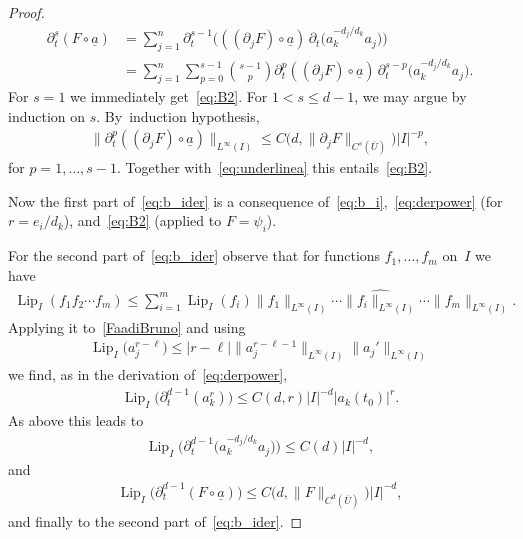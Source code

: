 \documentclass[pdftex]{sigma}
\numberwithin{equation}{section}
\def\ps{\psi}
\def\p{\partial}
\def\ul{\underline}
\def\Lip{\on{Lip}}
\renewcommand{\o}{\circ}
\let\on=\operatorname
\begin{document}
\begin{proof}
\begin{align*}
 \p_t^s (F \o \ul a)
 &= \sum_{j=1}^n \p_t^{s-1}\Big(((\p_{j} F)\o \ul a)\, \p_t \big( a_k^{- d_j/d_k} a_j\big)\Big)
 \\
 &= \sum_{j=1}^n \sum_{p=0}^{s-1}
 \binom{s-1}{p} \p_t^{p}((\p_{j} F)\o \ul a)\, \p_t^{s- p} \big( a_k^{- d_j/d_k} a_j\big).
 \end{align*}
 For $s=1$ we immediately get~\eqref{eq:B2}. For $1< s \le d-1$, we may argue by induction on $s$. By~induction hypothesis,
 \begin{gather*}
 \|\p_t^{p}((\p_{j} F)\o \ul a)\|_{L^\infty(I)} \le C\big(d,\|\p_{j} F\|_{C^{s}(\overline U)}\big) |I|^{-p},
 \end{gather*}
 for $p = 1,\dots,s-1$. Together with~\eqref{eq:underlinea} this entails~\eqref{eq:B2}.





 Now the first part of~\eqref{eq:b_ider} is a consequence of~\eqref{eq:b_i},~\eqref{eq:derpower} (for $r = e_i/d_k$),
 and~\eqref{eq:B2} (applied to $F= \ps_i$).




For the second part of~\eqref{eq:b_ider}
observe that for functions $f_1,\dots,f_m$ on~$I$ we have
\begin{gather*}
 \Lip_I(f_1 f_2 \cdots f_m) \le \sum_{i=1}^m \Lip_I(f_i) \|f_1\|_{L^{\infty}(I)} \cdots \widehat{\|f_i\|_{L^{\infty}(I)}}
 \cdots \|f_m\|_{L^{\infty}(I)}.
\end{gather*}
Applying it to~\eqref{FaadiBruno} and using
\begin{gather*}
 \Lip_I\big(a_j^{r-\ell}\big) \le |r-\ell| \|a_j^{r-\ell-1} \|_{L^\infty(I)} \| a_j'\|_{L^\infty(I)}
\end{gather*}
we find, as in the derivation of~\eqref{eq:derpower},
\begin{gather*}
 \Lip_I\big(\p_t^{d-1}( a_k^r)\big) \le C(d,r) |I|^{-d} |a_k(t_0)|^{r}.
\end{gather*}
As above this leads to
\begin{gather*}
 \Lip_I\big(\p_t^{d-1} \big( a_k^{- d_j/d_k} a_j\big) \big)
 \le C(d) |I|^{-d},
 \end{gather*}
and
\begin{gather*}
 \Lip_I \big(\p_t^{d-1}(F \o \ul a)\big) \le C\big(d, \|F\|_{C^d(\overline U)}\big) |I|^{-d},
\end{gather*}
and finally to the second part of~\eqref{eq:b_ider}.
\end{proof}
\end{document}

